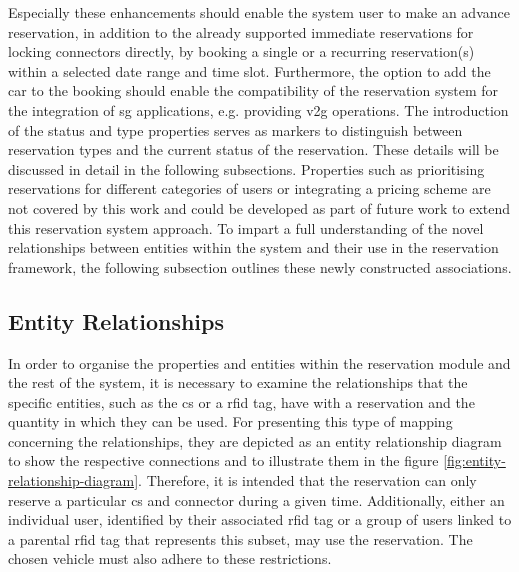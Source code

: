 \noindent Especially these enhancements should enable the system user to make an advance reservation, in addition to the already supported immediate reservations for locking connectors directly, by booking a single or a recurring reservation(s) within a selected date range and time slot.
Furthermore, the option to add the car to the booking should enable the compatibility of the reservation system for the integration of \acrshort{sg} applications, e.g. providing \acrshort{v2g} operations.
The introduction of the status and type properties serves as markers to distinguish between reservation types and the current status of the reservation. These details will be discussed in detail in the following subsections.
Properties such as prioritising reservations for different categories of users or integrating a pricing scheme are not covered by this work and could be developed as part of future work to extend this reservation system approach.
To impart a full understanding of the novel relationships between entities within the system and their use in the reservation framework, the following subsection outlines these newly constructed associations.

\subsection{Entity Relationships}
\label{ch:Design:sec:Reservation:ssec:Entity Relationships}

In order to organise the properties and entities within the reservation module and the rest of the system, it is necessary to examine the relationships that the specific entities, such as the \acrshort{cs} or a \acrshort{rfid} tag, have with a reservation and the quantity in which they can be used.
For presenting this type of mapping concerning the relationships, they are depicted as an entity relationship diagram to show the respective connections and to illustrate them in the figure \ref{fig:entity-relationship-diagram}.
Therefore, it is intended that the reservation can only reserve a particular \acrshort{cs} and connector during a given time. Additionally, either an individual user, identified by their associated \acrshort{rfid} tag or a group of users linked to a parental \acrshort{rfid} tag that represents this subset, may use the reservation. The chosen vehicle must also adhere to these restrictions.

